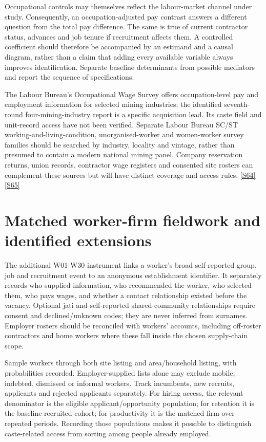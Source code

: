 \documentclass[11pt,a4paper]{report}
\begin{document}
Occupational controls may themselves reflect the labour-market channel under study. Consequently, an occupation-adjusted pay contrast answers a different question from the total pay difference. The same is true of current contractor status, advances and job tenure if recruitment affects them. A controlled coefficient should therefore be accompanied by an estimand and a causal diagram, rather than a claim that adding every available variable always improves identification. Separate baseline determinants from possible mediators and report the sequence of specifications.

The Labour Bureau's Occupational Wage Survey offers occupation-level pay and employment information for selected mining industries; the identified seventh-round four-mining-industry report is a specific acquisition lead. Its caste field and unit-record access have not been verified. Separate Labour Bureau SC/\allowbreak{}ST working-and-living-condition, unorganised-worker and women-worker survey families should be searched by industry, locality and vintage, rather than presumed to contain a modern national mining panel. Company reservation returns, union records, contractor wage registers and consented site rosters can complement these sources but will have distinct coverage and access rules. \hyperlink{S64}{[S64]} \hyperlink{S65}{[S65]}

\section{Matched worker-firm fieldwork and identified extensions}
The additional W01-W30 instrument links a worker's broad self-reported group, job and recruitment event to an anonymous establishment identifier. It separately records who supplied information, who recommended the worker, who selected them, who pays wages, and whether a contact relationship existed before the vacancy. Optional jati and self-reported shared-community relationships require consent and declined/\allowbreak{}unknown codes; they are never inferred from surnames. Employer rosters should be reconciled with workers' accounts, including off-roster contractors and home workers where these fall inside the chosen supply-chain scope.

Sample workers through both site listing and area/\allowbreak{}household listing, with probabilities recorded. Employer-supplied lists alone may exclude mobile, indebted, dismissed or informal workers. Track incumbents, new recruits, applicants and rejected applicants separately. For hiring access, the relevant denominator is the eligible applicant/\allowbreak{}opportunity population; for retention it is the baseline recruited cohort; for productivity it is the matched firm over repeated periods. Recording those populations makes it possible to distinguish caste-related access from sorting among people already employed.
\end{document}
